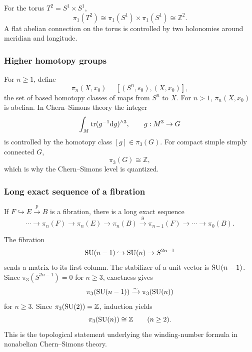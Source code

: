 For the torus $T^2 = S^1 \times S^1$,
\begin{equation}
  \pi_1(T^2) \cong \pi_1(S^1) \times \pi_1(S^1) \cong \mathbb{Z}^2.
\end{equation}
A flat abelian connection on the torus is controlled by two holonomies around meridian and longitude.

\subsubsection{Higher homotopy groups}

For $n \ge 1$, define
\begin{equation}
  \pi_n(X,x_0) = [ (S^n,s_0),(X,x_0) ],
\end{equation}
the set of based homotopy classes of maps from $S^n$ to $X$. For $n>1$, $\pi_n(X,x_0)$ is abelian. In Chern--Simons theory the integer
\begin{equation}
  \int_M \operatorname{tr}(g^{-1}\mathrm{d} g)^{\wedge 3},
  \qquad
  g : M^3 \to G
\end{equation}
is controlled by the homotopy class $[g]\in\pi_3(G)$. For compact simple simply connected $G$,
\begin{equation}
  \pi_3(G) \cong \mathbb{Z},
\end{equation}
which is why the Chern--Simons level is quantized.

\subsubsection{Long exact sequence of a fibration}

If $F \hookrightarrow E \xrightarrow{p} B$ is a fibration, there is a long exact sequence
\begin{equation}
  \cdots \to \pi_n(F) \to \pi_n(E) \to \pi_n(B)
  \xrightarrow{\partial}
  \pi_{n-1}(F) \to \cdots \to \pi_0(B).
\end{equation}

The fibration
\begin{equation}
  \operatorname{SU}(n-1) \hookrightarrow \operatorname{SU}(n) \to S^{2n-1}
\end{equation}
sends a matrix to its first column. The stabilizer of a unit vector is $\operatorname{SU}(n-1)$. Since $\pi_3(S^{2n-1})=0$ for $n\ge 3$, exactness gives
\begin{equation}
  \pi_3(\operatorname{SU}(n-1)) \xrightarrow{\sim} \pi_3(\operatorname{SU}(n))
\end{equation}
for $n\ge 3$. Since $\pi_3(\operatorname{SU}(2))=\mathbb{Z}$, induction yields
\begin{equation}
  \pi_3(\operatorname{SU}(n)) \cong \mathbb{Z}
  \qquad
  (n\ge 2).
\end{equation}
This is the topological statement underlying the winding-number formula in nonabelian Chern--Simons theory.

